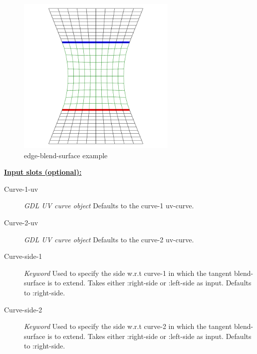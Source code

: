 \documentclass [11pt]{book}
\begin{document}
\begin{itemize}
\begin{figure}
\begin{center}
\includegraphics[width=3in,height=3in]{../images/example-edge-blend-surface.pdf}
\end{center}

\caption{edge-blend-surface example}

\label{fig:edge-blend-surface}

\end{figure}





\textbf{
\underline{Input slots (optional):}}

\begin{description}

\item [Curve-1-uv]
\emph{GDL UV curve object} Defaults to the curve-1 uv-curve.


\item [Curve-2-uv]
\emph{GDL UV curve object} Defaults to the curve-2 uv-curve.


\item [Curve-side-1]
\emph{Keyword} Used to specify the side w.r.t curve-1 in which the tangent blend-surface is to extend. Takes either :right-side or :left-side as input. Defaults to :right-side.


\item [Curve-side-2]
\emph{Keyword} Used to specify the side w.r.t curve-2 in which the tangent blend-surface is to extend. Takes either :right-side or :left-side as input. Defaults to :right-side.


\end{description}







\end{itemize}
\end{document}

